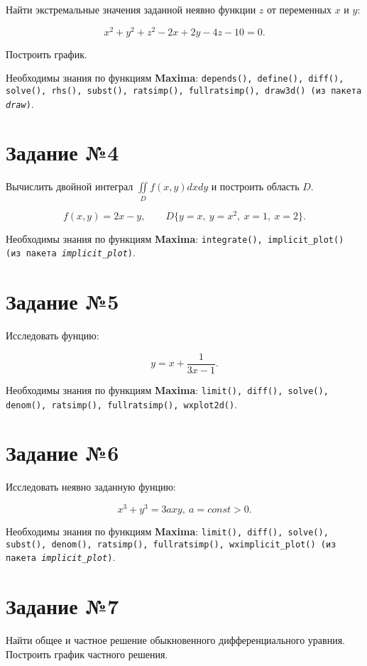 	Найти экстремальные значения заданной неявно функции $z$ от переменных $x$ и $y$: 
	
	\[
		x^{2} + y^{2} + z^{2} - 2 x + 2 y - 4 z - 10 = 0.
	\]
	
	Построить график.
	
	Необходимы знания по функциям \textbf{Maxima}: {\tt depends(), define(), diff(), solve(), rhs(), subst(), ratsimp(), fullratsimp(), draw3d() (из пакета \textit{draw})}.

\section*{Задание №4}

	Вычислить двойной интеграл $\iint\limits_{D} f(x,y) dx dy$ и построить область $D$.
	
	\[
		f(x,y) = 2 x - y, \qquad D \{ y = x, \: y = x^{2}, \: x = 1, \: x = 2 \}.
	\]
	
	Необходимы знания по функциям \textbf{Maxima}: {\tt integrate(), implicit\_plot() (из пакета \textit{implicit\_plot})}.

\section*{Задание №5}

    Исследовать фунцию:

    \[
        y = x + \frac{1}{3 x - 1}.
    \]
    
    Необходимы знания по функциям \textbf{Maxima}: {\tt limit(), diff(), solve(), denom(), ratsimp(), fullratsimp(), wxplot2d()}.

\section*{Задание №6}

	Исследовать неявно заданную фунцию:
	
	\[
		x^{3} + y^{3} = 3 a x y, \: a = const > 0.
	\]
	
	Необходимы знания по функциям \textbf{Maxima}: {\tt limit(), diff(), solve(), subst(), denom(), ratsimp(), fullratsimp(), wximplicit\_plot() (из пакета \textit{implicit\_plot})}.

\section*{Задание №7}

	Найти общее и частное решение обыкновенного дифференциального уравния. Построить график частного решения.
	

